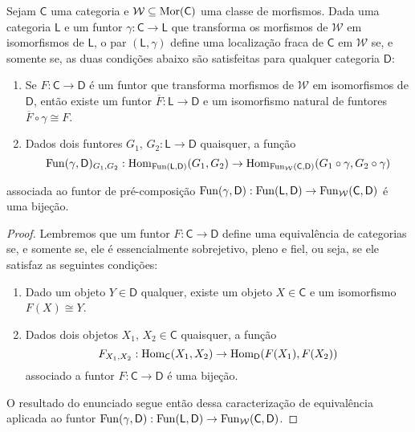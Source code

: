 \begin{prop}\label{prop:localizacao_fraca_via_prop_universal}
  Sejam $\mathsf{C}$ uma categoria e $\mathcal{W} \subseteq \mathrm{Mor}(\mathsf{C})$ uma classe de morfismos.
  Dada uma categoria $\mathsf{L}$ e um funtor $\gamma: \mathsf{C} \to \mathsf{L}$ que transforma os morfismos de $\mathcal{W}$ em isomorfismos de $\mathsf{L}$, o par $(\mathsf{L},\gamma)$ define uma localização fraca de $\mathsf{C}$ em $\mathcal{W}$ se, e somente se, as duas condições abaixo são satisfeitas para qualquer categoria $\mathsf{D}$:
  \begin{enumerate}
  \item Se $F: \mathsf{C} \to \mathsf{D}$ é um funtor que transforma morfismos de $\mathcal{W}$ em isomorfismos de $\mathsf{D}$, então existe um funtor $\overline{F}: \mathsf{L} \to \mathsf{D}$ e um isomorfismo natural de funtores $\overline{F} \circ \gamma \cong F$.
    
  \item Dados dois funtores $G_{1},\, G_{2}: \mathsf{L} \to \mathsf{D}$ quaisquer, a função
    \begin{displaymath}
      \mathrm{Fun}(\gamma,\mathsf{D})_{G_{1},G_{2}}: \mathrm{Hom}_{\mathrm{Fun}(\mathsf{L},\mathsf{D})}(G_{1},G_{2}) \to \mathrm{Hom}_{\mathrm{Fun}_{\mathcal{W}}(\mathsf{C},\mathsf{D})}(G_{1} \circ \gamma, G_{2} \circ \gamma)
    \end{displaymath}
  \end{enumerate}
  associada ao funtor de pré-composição $\mathrm{Fun}(\gamma,\mathsf{D}): \mathrm{Fun}(\mathsf{L},\mathsf{D}) \to \mathrm{Fun}_{\mathcal{W}}(\mathsf{C},\mathsf{D})$ é uma bijeção.
\end{prop}

\begin{proof}
  Lembremos que um funtor $F: \mathsf{C} \to \mathsf{D}$ define uma equivalência de categorias se, e somente se, ele é essencialmente sobrejetivo, pleno e fiel, ou seja, se ele satisfaz as seguintes condições:
  \begin{enumerate}
  \item Dado um objeto $Y \in \mathsf{D}$ qualquer, existe um objeto $X \in \mathsf{C}$ e um isomorfismo $F(X) \cong Y$.
    
  \item Dados dois objetos $X_{1},\, X_{2} \in \mathsf{C}$ quaisquer, a função
    \begin{displaymath}
      F_{X_{1},X_{2}}: \mathrm{Hom}_{\mathsf{C}}(X_{1},X_{2}) \to \mathrm{Hom}_{\mathsf{D}}(F(X_{1}),F(X_{2}))
    \end{displaymath}
    associado a funtor $F: \mathsf{C} \to \mathsf{D}$ é uma bijeção.
  \end{enumerate}

  O resultado do enunciado segue então dessa caracterização de equivalência aplicada ao funtor $\mathrm{Fun}(\gamma,\mathsf{D}): \mathrm{Fun}(\mathsf{L},\mathsf{D}) \to \mathrm{Fun}_{\mathcal{W}}(\mathsf{C},\mathsf{D})$.
\end{proof}

